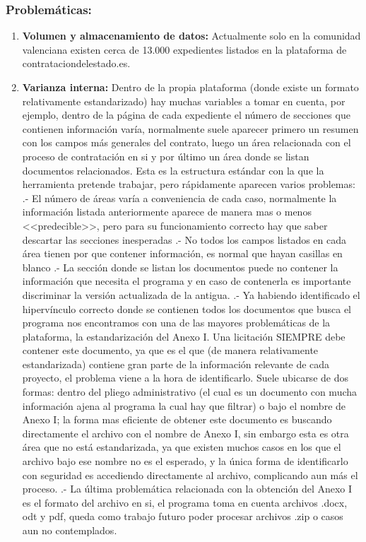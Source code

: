\documentclass{article}
\begin{document}
\subsubsection{Problemáticas:}
\begin{enumerate}
    \item \textbf{Volumen y almacenamiento de datos:}
    Actualmente solo en la comunidad valenciana existen cerca de 13.000 expedientes listados en la plataforma de contrataciondelestado.es.    
    \item \textbf{Varianza interna:}
    Dentro de la propia plataforma (donde existe un formato relativamente estandarizado) hay muchas variables a tomar en cuenta, por ejemplo, dentro de la página de cada expediente el número de secciones que contienen información varía, normalmente suele aparecer primero un resumen con los campos más generales del contrato, luego  un área relacionada con el proceso de contratación en si y por último un área donde se listan documentos relacionados.
    \newline Esta es la estructura estándar con la que la herramienta pretende trabajar, pero rápidamente aparecen varios problemas: 
    .- El número de áreas varía a conveniencia de cada caso, normalmente la información listada anteriormente  aparece de manera mas o menos <<predecible>>, pero para su funcionamiento correcto hay que saber descartar las secciones inesperadas 
    .- No todos los campos listados en cada área tienen por que contener información, es normal que hayan casillas en blanco
    .- La sección donde se listan los documentos puede no contener la información que necesita el programa y en caso de contenerla es importante discriminar la versión actualizada de la antigua.
    .- Ya habiendo identificado el hipervínculo correcto donde se contienen todos los documentos que busca el programa nos encontramos con una de las mayores problemáticas de la plataforma, la estandarización del Anexo I. Una licitación SIEMPRE debe contener este documento, ya que es el que (de manera relativamente estandarizada) contiene gran parte de la información relevante de cada proyecto, el problema viene a la hora de identificarlo. Suele ubicarse de dos formas: dentro del pliego administrativo (el cual es un documento con mucha información ajena al programa la cual hay que filtrar) o bajo el nombre de Anexo I; la forma mas eficiente de obtener este documento es buscando directamente el archivo con el nombre de Anexo I, sin embargo esta es otra área que no está estandarizada, ya que existen muchos casos en los que el archivo bajo ese nombre no es el esperado, y la única forma de identificarlo con seguridad es accediendo directamente al archivo, complicando aun más el proceso. 
    .- La última problemática relacionada con la obtención del Anexo I es el formato del archivo en si, el programa toma en cuenta archivos .docx, odt y pdf, queda como trabajo futuro poder procesar archivos .zip o casos aun no contemplados.
    

\end{enumerate}
\end{document}
